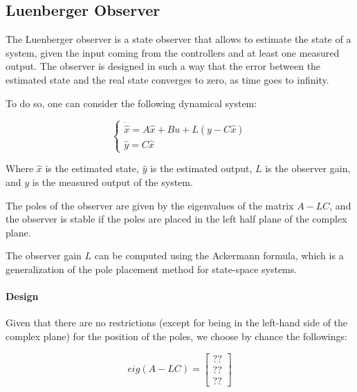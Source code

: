 \subsection{Luenberger Observer}
\label{sec:luenberger_observer}

The Luenberger observer is a state observer that allows to estimate the state of a system, given the input coming from the controllers and at least one measured output.
The observer is designed in such a way that the error between the estimated state and the real state converges to zero, as time goes to infinity.

To do so, one can consider the following dynamical system:

\begin{equation}
    \begin{cases}
        \dot{\hat{x}} = A \hat{x} + B u + L(y - C \hat{x}) \\
        \hat{y} = C \hat{x}
    \end{cases}
    \label{eq:observer_dynamics}
\end{equation}

Where $\hat{x}$ is the estimated state, $\hat{y}$ is the estimated output, $L$ is the observer gain, and $y$ is the measured output of the system.

The poles of the observer are given by the eigenvalues of the matrix $A - LC$, and the observer is stable if the poles are placed in the left half plane of the complex plane.

The observer gain $L$ can be computed using the Ackermann formula, which is a generalization of the pole placement method for state-space systems.

\paragraph{Design}

Given that there are no restrictions (except for being in the left-hand side of the complex plane) for the position of the poles, we choose by chance the followings:

\begin{equation}
    eig(A-LC) = \begin{bmatrix}
        ?? \\
        ?? \\
        ??
    \end{bmatrix}
    \label{eq:luenberger_observer_poles}
\end{equation}
